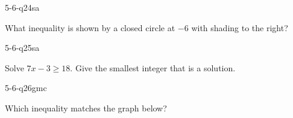 \begin{practiceQuestion}{5-6-q24}{sa}
\begin{questionText}
What inequality is shown by a closed circle at $-6$ with shading to the right?
\end{questionText}
\end{practiceQuestion}

\begin{practiceQuestion}{5-6-q25}{sa}
\begin{questionText}
Solve $7x - 3 \geq 18$. Give the smallest integer that is a solution.
\end{questionText}
\end{practiceQuestion}


\begin{practiceQuestion}{5-6-q26}{gmc}
\begin{questionText}
Which inequality matches the graph below?

\begin{center}
\end{center}
\end{questionText}
\end{practiceQuestion}

